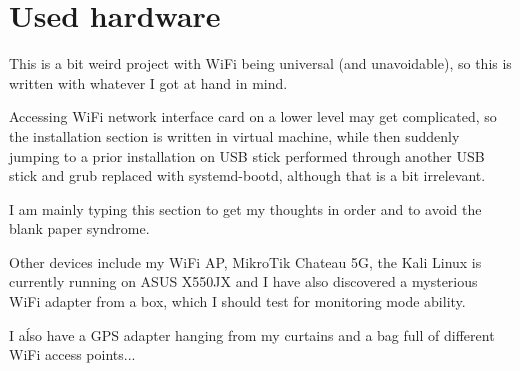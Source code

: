 \documentclass[../wifi-security.tex]{subfiles}
\begin{document}
\chapter{Used hardware}

This is a bit weird project with WiFi being universal (and unavoidable), so this is written with whatever I got at hand in mind.

Accessing WiFi network interface card on a lower level may get complicated, so the installation section is written in virtual machine, while then suddenly jumping to a prior installation on USB stick performed through another USB stick and grub replaced with systemd-bootd, although that is a bit irrelevant.

I am mainly typing this section to get my thoughts in order and to avoid the blank paper syndrome.

Other devices include my WiFi AP, MikroTik Chateau 5G, the Kali Linux is currently running on ASUS X550JX and I have also discovered a mysterious WiFi adapter from a box, which I should test for monitoring mode ability.

I aĺso have a GPS adapter hanging from my curtains and a bag full of different WiFi access points...
\end{document}
